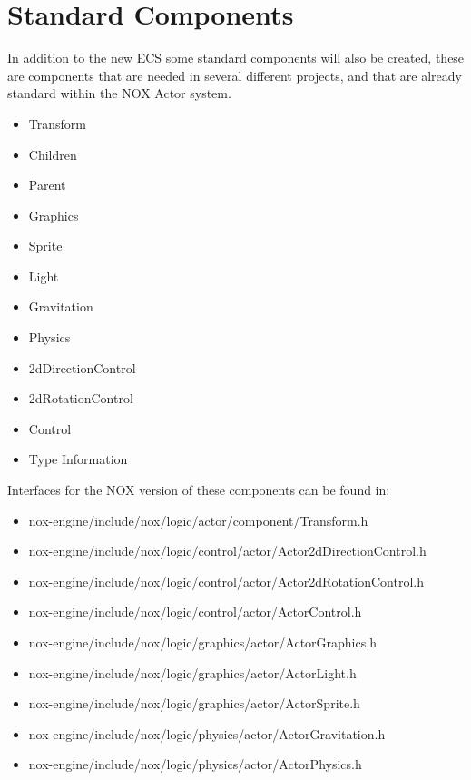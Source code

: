 \section{Standard Components}
In addition to the new ECS some standard components will also be created, these are components that are needed in several different projects, 
and that are already standard within the NOX Actor system.

\begin{itemize}
    \item
    Transform

    \item
    Children

    \item
    Parent

    \item
    Graphics

    \item
    Sprite 

    \item
    Light

    \item
    Gravitation

    \item
    Physics

    \item
    2dDirectionControl

    \item
    2dRotationControl

    \item
    Control

    \item
    Type Information
\end{itemize}

Interfaces for the NOX version of these components can be found in:
\begin{itemize}
    \item
    nox-engine/include/nox/logic/actor/component/Transform.h
    
    \item
    nox-engine/include/nox/logic/control/actor/Actor2dDirectionControl.h
    
    \item
    nox-engine/include/nox/logic/control/actor/Actor2dRotationControl.h
    
    \item
    nox-engine/include/nox/logic/control/actor/ActorControl.h
    
    \item
    nox-engine/include/nox/logic/graphics/actor/ActorGraphics.h
    
    \item
    nox-engine/include/nox/logic/graphics/actor/ActorLight.h
    
    \item
    nox-engine/include/nox/logic/graphics/actor/ActorSprite.h
    
    \item
    nox-engine/include/nox/logic/physics/actor/ActorGravitation.h
    
    \item
    nox-engine/include/nox/logic/physics/actor/ActorPhysics.h
\end{itemize}
